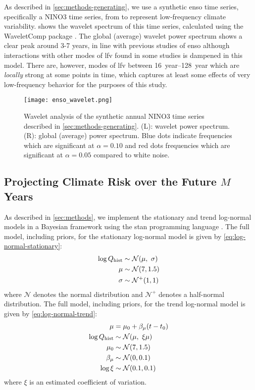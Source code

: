\documentclass[
  draft,
  linenumbers
]{agujournal2018}
\newcommand{\normal}{\mathcal{N}}
\begin{document}
As described in \cref{sec:methods-generating}, we use a synthetic \gls{enso} time series, specifically a NINO3 time series, from \citep{Ramesh:2016hf} to represent low-frequency climate variability.
 shows the wavelet spectrum of this time series, calculated using the WaveletComp package \citep{Roesch:wlBQQoIs}.
The global (average) wavelet power spectrum shows a clear peak around 3-7 years, in line with previous studies of \gls{enso} although interactions with other modes of \acrfull{lfv} found in some studies \citep{Jin:1994wq} is dampened in this model.
There are, however, modes of \gls{lfv} between \SIrange{16}{128}{year} which are \emph{locally} strong at some points in time, which captures at least some effects of very low-frequency behavior for the purposes of this study.
\begin{figure}
  \texttt{[image: enso\_wavelet.png]}
  \caption{
    Wavelet analysis of the synthetic annual NINO3 time series described in \cref{sec:methods-generating}.
    (L): wavelet power spectrum.
    (R): global (average) power spectrum.
    Blue dots indicate frequencies which are significant at $\alpha=0.10$ and red dots frequencies which are significant at $\alpha=0.05$ compared to white noise.
  }\label{fig:enso-ts}
\end{figure}

\subsection{Projecting Climate Risk over the Future $M$ Years}

As described in \cref{sec:methods}, we implement the stationary and trend log-normal models in a Bayesian framework using the stan programming language \citep{Carpenter:2017ke}.
The full model, including priors, for the stationary log-normal model is given by \cref{eq:log-normal-stationary}:
\begin{align}\label{eq:log-normal-stationary}
  \begin{split}
    \log Q_\text{hist} & \sim \normal \qty(\mu, \ \sigma) \\
    \mu &\sim \normal \qty(7, 1.5) \\
    \sigma &\sim \normal^+ \qty(1, 1)
  \end{split}
\end{align}
where $\normal$ denotes the normal distribution and $\normal^+$ denotes a half-normal distribution.
The full model, including priors, for the trend log-normal model is given by \cref{eq:log-normal-trend}:
\begin{align}\label{eq:log-normal-trend}
  \begin{split}
    \mu &= \mu_0 + \beta_\mu \qty(t - t_0) \\
    \log Q_\text{hist} & \sim \normal \qty(\mu, \ \xi \mu) \\
    \mu_0 & \sim \normal \qty(7, 1.5) \\
    \beta_\mu & \sim \normal \qty(0, 0.1) \\
    \log \xi & \sim \normal \qty(0.1, 0.1)
  \end{split}
\end{align}
where $\xi$ is an estimated coefficient of variation.
\end{document}
